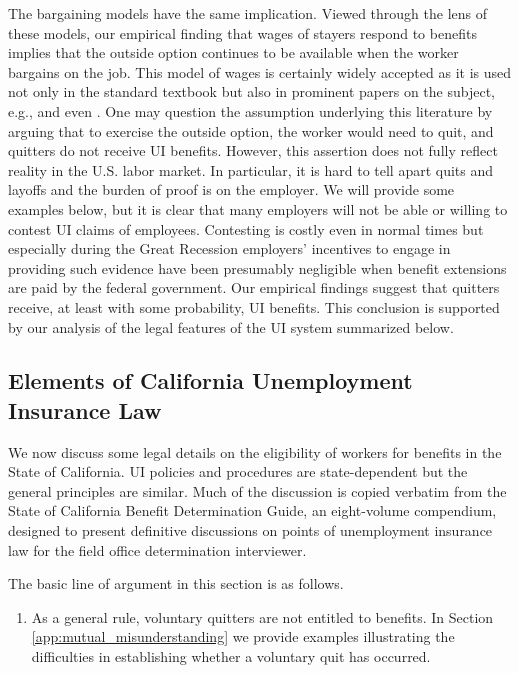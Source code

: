 \documentclass[12pt]{article}
\newcommand{\1}{\mathbf{1}}
\begin{document}
\begin{appendix}
The bargaining models have the same implication. Viewed through the lens of these models, our empirical finding that wages of stayers respond to benefits implies that the outside option continues to be available when the worker bargains on the job. This model of wages is certainly widely accepted as it is used not only in the standard \citet{pissarides:00} textbook but also in prominent papers on the subject, e.g., \citet{hall+milgrom:08} and even \citet{hall:05}. One may question the assumption underlying this literature by arguing that to exercise the outside option, the worker would need to quit, and quitters do not receive UI benefits. However, this assertion does not fully reflect reality in the U.S. labor market. In particular, it is hard to tell apart quits and layoffs and the burden of proof is on the employer. We will provide some examples below, but it is clear that many employers will not be able or willing to contest UI claims of employees. Contesting is costly even in normal times but especially during the Great Recession employers' incentives to engage in providing such evidence have been presumably negligible when benefit extensions are paid by the federal government. Our empirical findings suggest that quitters receive, at least with some probability, UI benefits. This conclusion is supported by our analysis of the legal features of the UI system summarized below.



\subsection{Elements of California Unemployment Insurance Law}
\label{sec:law}

We now discuss some legal details on the eligibility of workers for benefits in the State of California. UI policies and procedures are state-dependent but the general principles are similar. Much of the discussion is copied verbatim from the State of California Benefit Determination Guide, an eight-volume compendium, designed to present definitive discussions on points of unemployment insurance law for the field office determination interviewer.

The basic line of argument in this section is as follows.
\begin{enumerate}
\item As a general rule, voluntary quitters are not entitled to benefits. In Section \ref{app:mutual_misunderstanding} we provide examples illustrating the difficulties in establishing whether a voluntary quit has occurred.


\end{enumerate}
\end{appendix}
\end{document}
